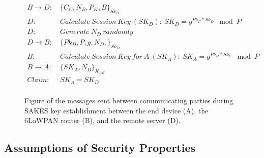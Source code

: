 \begin{figure}[h]
\begin{tcolorbox}[title=Key Establishment in SAKES]
\begin{align*}
B \rightarrow D:\ & \{C_C, N_B, P_K, B\}_{Sk_B} \\
D:\ & Calculate\ Session\ Key\ (SK_D):\ SK_D = g^{Pk_C * Sk_D} \mod{P}\\
D:\ & Generate\ N_D\ randomly\\
D \rightarrow B:\ & \{Pk_D, P, g, N_D, \}_{Sk_D}\\
B:\ & Calculate\ Session\ Key\ for\ A\ (SK_A):\ SK_A = g^{Pk_D * Sk_C} \mod{P}\\
B \rightarrow A:\ & \{SK_A, N_B\}_{K_{AB}}\\
Claim:\ & SK_A = SK_D\\
\end{align*}
\end{tcolorbox}
\caption{Figure of the messages sent between communicating parties during SAKES key establishment between the end device (A), the 6LoWPAN router (B), and the remote server (D).}
\label{fig:sakes-keys}
\end{figure}


\subsection{Assumptions of Security Properties}











